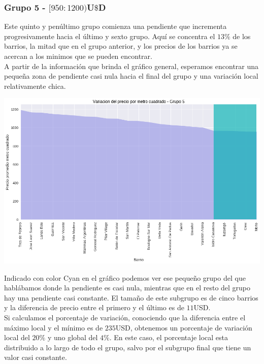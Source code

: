 \documentclass[a4paper, 10pt]{article}
\newcommand\tab[1][0.5cm]{\hspace*{#1}}
\begin{document}
				\subsubsection{Grupo 5 - $[950:1200)$U$\$$D}
					Este quinto y penúltimo grupo comienza una pendiente que incrementa progresivamente hacia el último y sexto
					grupo. Aquí se concentra el $13\%$ de los barrios, la mitad que en el grupo anterior, y los precios de los
					barrios ya se acercan a los minimos que se pueden encontrar.\\
					\tab A partir de la información que brinda el gráfico general, esperamos encontrar una pequeña zona de pendiente
					casi nula hacia el final del grupo y una variación local relativamente chica.
					\begin{center}
   		    				\includegraphics[width=\textwidth]{images/m2Group5Area}
				  	\end{center}
				  	\tab Indicado con color Cyan en el gráfico podemos ver ese pequeño grupo del que hablábamos donde la pendiente
				  	es casi nula, mientras que en el resto del grupo hay una pendiente casi constante. El tamaño de este subgrupo
				  	es de cinco barrios y la diferencia de precio entre el primero y el último es de $11$USD. \\
				  	\tab Si calculamos el porcentaje de variación, conociendo que la diferencia entre el máximo local y el mínimo
				  	es de $235$USD, obtenemos un porcentaje de variación local del $20\%$ y uno global del $4\%$. En este caso, el
				  	porcentaje local esta distribuido a lo largo de todo el grupo, salvo por el subgrupo final que tiene un valor
				  	casi constante.
\end{document}
